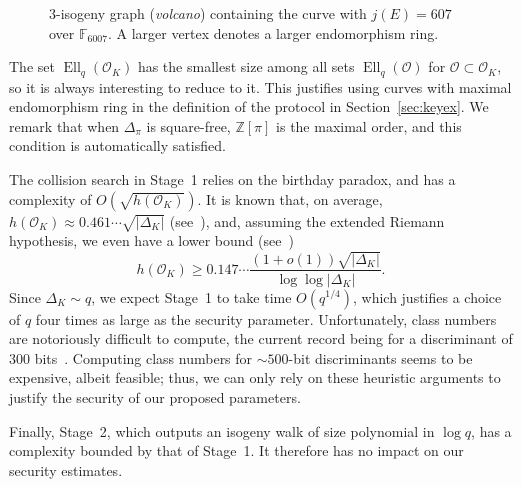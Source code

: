 \documentclass{llncs}
\newcommand{\F}{\mathbb{F}}
\renewcommand{\O}{\mathcal{O}}
\DeclareMathOperator{\Ell}{Ell}
\begin{document}
\begin{figure}
  \centering
  \caption{$3$-isogeny graph (\emph{volcano}) containing the curve
    with $j(E)=607$ over $\F_{6007}$. A larger vertex denotes a larger
    endomorphism ring.}
  \label{fig:volcano}
\end{figure}

The set $\Ell_q(\O_K)$ has the smallest size among all sets
$\Ell_q(\O)$ for $\O⊂\O_K$, so it is always interesting to
reduce to it. This justifies using curves with maximal endomorphism
ring in the definition of the protocol in
Section~\ref{sec:keyex}. We remark that when $Δ_π$ is square-free, $ℤ[π]$
is the maximal order, and this condition is automatically satisfied.

The collision search in Stage~1 relies on the birthday paradox, and
has a complexity of $O(\sqrt{h(\O_K)})$.
It is known that, on average,
$h(\O_K)≈0.461\cdots\sqrt{|Δ_K|}$ (see~\cite[5.10]{Cohen1993}), and,
assuming the extended Riemann hypothesis, we even have a lower bound
(see~\cite{littlewood1928class})
\[h(\O_K) ≥ 0.147\cdots\frac{(1+o(1))\sqrt{|Δ_K|}}{\log\log|Δ_K|}.\]
Since $Δ_K\sim q$, we expect Stage~1 to take time $O(q^{1/4})$,
which justifies a choice of $q$ four times as large as the
security parameter.  Unfortunately, class numbers are notoriously
difficult to compute, the current record being
for a discriminant of 300 bits~\cite{10.1007/978-3-642-14081-5_15}.
Computing class numbers for ${\sim 500}$-bit discriminants seems to be expensive,
albeit feasible; thus, we can only rely on these heuristic arguments
to justify the security of our proposed parameters.

Finally, Stage~2,
which outputs an isogeny walk of size polynomial in $\log q$,
has a complexity bounded by that of Stage~1.
It therefore has no impact on our security estimates.
\end{document}
